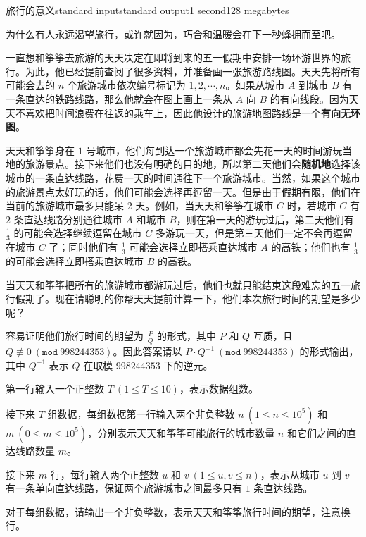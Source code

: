 \begin{problem}{旅行的意义}{standard input}{standard output}{1 second}{128 megabytes}

    为什么有人永远渴望旅行，或许就因为，巧合和温暖会在下一秒蜂拥而至吧。

    一直想和筝筝去旅游的天天决定在即将到来的五一假期中安排一场环游世界的旅行。为此，他已经提前查阅了很多资料，并准备画一张旅游路线图。天天先将所有可能会去的 $n$ 个旅游城市依次编号标记为 $1,2,\cdots,n$。如果从城市 $A$ 到城市 $B$ 有一条直达的铁路线路，那么他就会在图上画上一条从 $A$ 向 $B$ 的有向线段。因为天天不喜欢把时间浪费在往返的乘车上，因此他设计的旅游地图路线是一个\textbf{有向无环图}。

    天天和筝筝身在 $1$ 号城市，他们每到达一个旅游城市都会先花一天的时间游玩当地的旅游景点。接下来他们也没有明确的目的地，所以第二天他们会\textbf{随机地}选择该城市的一条直达线路，花费一天的时间通往下一个旅游城市。当然，如果这个城市的旅游景点太好玩的话，他们可能会选择再逗留一天。但是由于假期有限，他们在当前的旅游城市最多只能呆 $2$ 天。例如，当天天和筝筝在城市 $C$ 时，若城市 $C$ 有 $2$ 条直达线路分别通往城市 $A$ 和城市 $B$，则在第一天的游玩过后，第二天他们有 $\frac{1}{3}$ 的可能会选择继续逗留在城市 $C$ 多游玩一天，但是第三天他们一定不会再逗留在城市 $C$ 了；同时他们有 $\frac{1}{3}$ 可能会选择立即搭乘直达城市 $A$ 的高铁；他们也有 $\frac{1}{3}$ 的可能会选择立即搭乘直达城市 $B$ 的高铁。

    当天天和筝筝把所有的旅游城市都游玩过后，他们也就只能结束这段难忘的五一旅行假期了。现在请聪明的你帮天天提前计算一下，他们本次旅行时间的期望是多少呢？

    容易证明他们旅行时间的期望为 $\frac{P}{Q}$ 的形式，其中 $P$ 和 $Q$ 互质，且 $Q\not\equiv 0\ (\texttt{mod}\ 998244353)$。因此答案请以 $P\cdot Q^{-1}\ (\texttt{mod}\ 998244353)$ 的形式输出，其中 $Q^{-1}$ 表示 $Q$ 在取模 $998244353$ 下的逆元。

    \InputFile
    
    第一行输入一个正整数 $T\ (1\le T\le 10)$，表示数据组数。
    
    接下来 $T$ 组数据，每组数据第一行输入两个非负整数 $n\ (1\le n\le 10^5)$ 和 $m\ (0\le m\le 10^5)$，分别表示天天和筝筝可能旅行的城市数量 $n$ 和它们之间的直达线路数量 $m$。

    接下来 $m$ 行，每行输入两个正整数 $u$ 和 $v\ (1\le u,v\le n)$，表示从城市 $u$ 到 $v$ 有一条单向直达线路，保证两个旅游城市之间最多只有 $1$ 条直达线路。
    
    \OutputFile
    
    对于每组数据，请输出一个非负整数，表示天天和筝筝旅行时间的期望，注意换行。
    

\end{problem}
